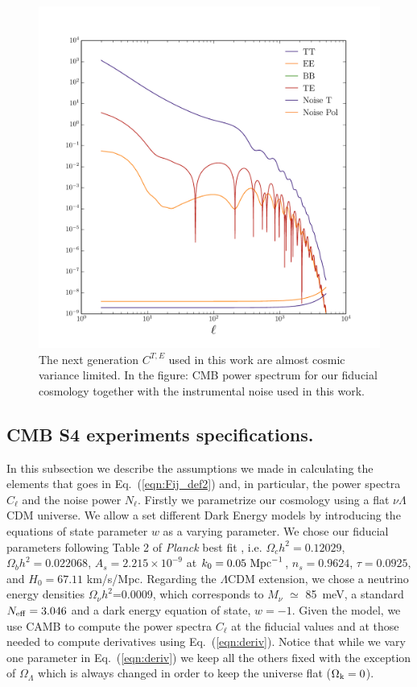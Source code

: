 \documentclass[aps,prd,reprint,superscriptaddress]{revtex4-1}
\newcommand\refeq[1]{Eq.~(\ref{eqn:#1})}
\begin{document}
\begin{figure}[htbp]
\begin{center}
\includegraphics[scale=0.4]{PS_with_noise.pdf}
\caption{The next generation $C^{T,E}$ used in this work are almost cosmic variance limited.
In the figure: CMB power spectrum for our fiducial cosmology together with the instrumental noise used in this work.}
\label{fig:cmb-cl-noise}
\end{center}
\end{figure}


\subsection{CMB S4 experiments specifications.\label{subsec:cosmo-noise}}
In this subsection we describe the assumptions we made in calculating the elements that goes in \refeq{Fij_def2} and, in particular, the power spectra $C_{\ell}$ and the noise power $N_{\ell}$.
Firstly we parametrize our cosmology using a flat $\nu \Lambda$CDM universe. We allow a set different Dark Energy models by introducing the equations of state parameter $w$ as a varying parameter.
We chose our fiducial parameters following Table 2 of \textit{Planck} best fit \cite{planck-collaboration:2014g}, i.e. $\Omega_c h^2 = 0.12029$, $\Omega_b h^2 = 0.022068$, $A_s = 2.215\times10^{-9}$ at $k_0 = 0.05\ {\rm Mpc}^{-1}$, $n_s = 0.9624$, $\tau = 0.0925$, and $H_0 = 67.11$ km/s/Mpc. Regarding the $\Lambda$CDM extension, we chose a neutrino energy densities $\Omega_{\nu} h^2$=0.0009, which corresponds to $M_{\nu}$ $\simeq$ 85\ meV, a standard $N_{\rm eff}=3.046$ and a dark energy equation of state, $w=-1$.
Given the model, we use CAMB \cite{Lewis:1999bs} to compute the power spectra $C_{\ell}$ at the fiducial values and at those needed to compute derivatives using \refeq{deriv}. Notice that while we vary one parameter in \refeq{deriv} we keep all the others fixed with the exception of $\Omega_{\Lambda}$ which is always changed in order to keep the universe flat ($\Omega_{\rm k} = 0$).
\end{document}
